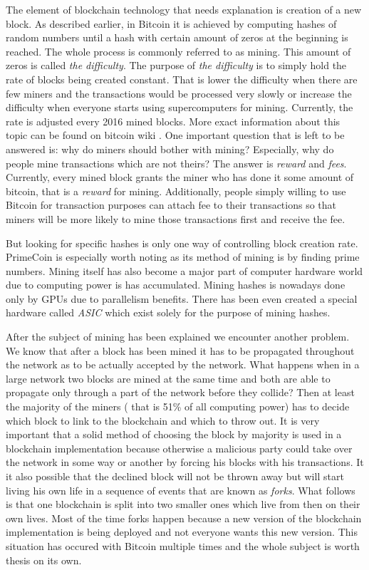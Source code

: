 \documentclass[a4paper,12pt,twoside,openany]{report}
\begin{document}
The element of blockchain technology that needs explanation is creation of a new block. As described earlier, in Bitcoin it is achieved by computing hashes of random numbers until a hash with certain amount of zeros at the beginning is reached. The whole process is commonly referred to as mining. This amount of zeros is called \textit{the difficulty}. The purpose of \textit{the difficulty} is to simply hold the rate of blocks being created constant. That is lower the difficulty when there are few miners and the transactions would be processed very slowly or increase the difficulty when everyone starts using supercomputers for mining. Currently, the rate is adjusted every 2016 mined blocks. More exact information about this topic can be found on bitcoin wiki \cite{Bitcoinwiki}. One important question that is left to be answered is: why do miners should bother with mining? Especially, why do people mine transactions which are not theirs? The answer is \textit{reward} and \textit{fees}. Currently, every mined block grants the miner who has done it some amount of bitcoin, that is a \textit{reward} for mining. Additionally, people simply willing to use Bitcoin for transaction purposes can attach fee to their transactions so that miners will be more likely to mine those transactions first and receive the fee. 

But looking for specific hashes is only one way of controlling block creation rate. PrimeCoin is especially worth noting as its method of mining is by finding prime numbers. Mining itself has also become a major part of computer hardware world due to computing power is has accumulated. Mining hashes is nowadays done only by GPUs due to parallelism benefits. There has been even created a special hardware called \textit{ASIC} which exist solely for the purpose of mining hashes.

After the subject of mining has been explained we encounter another problem. We know that after a block has been mined it has to be propagated throughout the network as to be actually accepted by the network.
What happens when in a large network two blocks are mined at the same time and both are able to propagate only through a part of the network before they collide? Then at least the majority of the miners ( that is 51\% of all computing power) has to decide which block to link to the blockchain and which to throw out. It is very important that a solid method of choosing the block by majority is used in a blockchain implementation because otherwise a malicious party could take over the network in some way or another by forcing his blocks with his transactions. It it also possible that the declined block will not be thrown away but will start living his own life in a sequence of events that are known as \textit{forks}. What follows is that one blockchain is split into two smaller ones which live from then on their own lives. Most of the time forks happen because a new version of the blockchain implementation is being deployed and not everyone wants this new version. This situation has occured with Bitcoin multiple times and the whole subject is worth thesis on its own.
\end{document}
